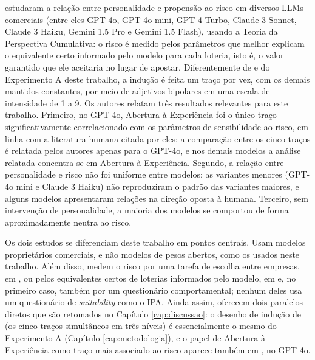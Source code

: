  estudaram a relação entre personalidade e
propensão ao risco em diversos LLMs comerciais (entre eles GPT-4o,
GPT-4o mini, GPT-4 Turbo, Claude 3 Sonnet, Claude 3 Haiku, Gemini 1.5 Pro
e Gemini 1.5 Flash), usando a Teoria da Perspectiva Cumulativa: o risco
é medido pelos parâmetros que melhor explicam o equivalente certo
informado pelo modelo para cada loteria, isto é, o valor garantido que
ele aceitaria no lugar de apostar. Diferentemente de
 e do Experimento A deste trabalho, a indução é
feita um traço por vez, com os demais mantidos constantes, por meio de
adjetivos bipolares em uma escala de intensidade de 1 a 9. Os autores
relatam três resultados relevantes para este trabalho. Primeiro, no
GPT-4o, Abertura à Experiência foi o único traço significativamente
correlacionado com os parâmetros de sensibilidade ao risco, em linha com
a literatura humana citada por eles; a comparação entre os cinco traços
é relatada pelos autores apenas para o GPT-4o, e nos demais modelos a
análise relatada concentra-se em Abertura à Experiência. Segundo, a
relação entre
personalidade e risco não foi uniforme entre modelos: as variantes
menores (GPT-4o mini e Claude 3 Haiku) não reproduziram o padrão das
variantes maiores, e alguns modelos apresentaram relações na direção
oposta à humana. Terceiro, sem intervenção de personalidade, a maioria
dos modelos se comportou de forma aproximadamente neutra ao risco.

Os dois estudos se diferenciam deste trabalho em pontos centrais. Usam
modelos proprietários comerciais, e não modelos de pesos abertos, como os
usados neste trabalho. Além disso, medem o risco por uma tarefa de escolha
entre empresas, em , ou pelos equivalentes certos
de loterias informados pelo modelo, em  e, no primeiro caso, também por um
questionário comportamental; nenhum deles usa um questionário de
\textit{suitability} como o IPA. Ainda assim, oferecem dois paralelos
diretos que são retomados no Capítulo \ref{cap:discussao}: o desenho de
indução de  (os cinco traços simultâneos em três
níveis) é essencialmente o mesmo do Experimento A (Capítulo
\ref{cap:metodologia}), e o papel de Abertura à Experiência como traço
mais associado ao risco aparece também em , no
GPT-4o.
